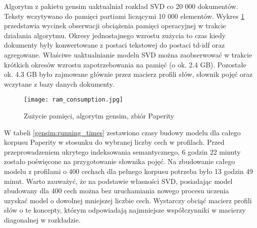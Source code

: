 \documentclass{pracamgr}
\begin{document}
\begin{table}[]
\centering
{}
\caption{Miara F1 klasyfikatora Logistic Regression w zależności od zbioru dokumentów, współczynnika regularyzacji oraz liczby cech}
\label{logistic-regression-efficiency}
\end{table}

Algorytm z pakietu gensim uaktualniał rozkład SVD co 20 000 dokumentów. Teksty wczytywano do pamięci partiami liczącymi 10 000 elementów. Wykres \ref{fig:ram_consumption} przedstawia wycinek obserwacji obciążenia pamięci operacyjnej w trakcie działania algorytmu. Okresy jednostajnego wzrostu zużycia to czas kiedy dokumenty były konwertowane z postaci tekstowej do postaci td-idf oraz agregowane. Właściwe uaktualnianie modelu SVD można zaobserwować w trakcie krótkich okresów wzrostu zapotrzebowania na pamięć (o ok. 2.4 GB). Pozostałe ok. 4.3 GB było zajmowane głównie przez macierz profili słów, słownik pojęć oraz wczytane z bazy danych dokumenty. 

\begin{figure}[]
\centering
  \texttt{[image: ram\_consumption.jpg]}
  \caption{Zużycie pamięci, algorytm gensim, zbiór Paperity}\label{fig:ram_consumption}
\end{figure}

W tabeli \ref{gensim:running_times} zestawiono czasy budowy modelu dla całego korpusu Paperity w stosunku do wybranej liczby cech w profilach. Przed przeprowadzeniem ukrytego indeksowania semantycznego, 6 godzin 22 minuty zostało poświęcone na przygotowanie słownika pojęć. Na zbudowanie całego modelu z profilami o 400 cechach dla pełnego korpusu potrzeba było 13 godzin 49 minut. Warto zauważyć, że na podstawie własności SVD, posiadając model zbudowany dla 400 cech można bez uruchamiania nowego procesu uczenia uzyskać model o dowolnej mniejszej liczbie cech. Wystarczy obciąć macierz profili słów o te koncepty, którym odpowiadają najmniejsze współczynniki w macierzy diagonalnej w rozkładzie.
\end{document}
